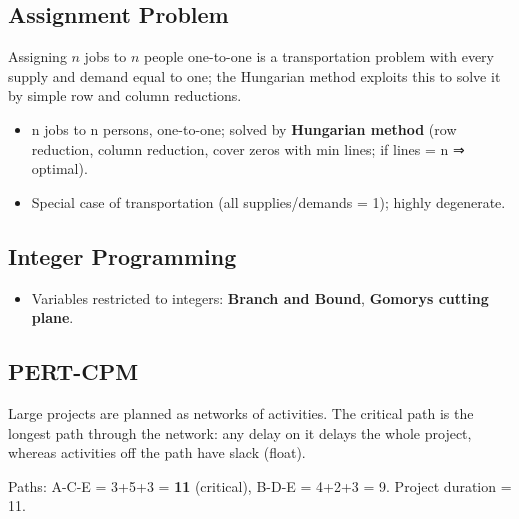 \needspace{125pt}

\hypertarget{p2-01--73-assignment-problem}{%
\subsection{Assignment Problem}\label{p2-01--73-assignment-problem}}

Assigning \(n\) jobs to \(n\) people one-to-one is a transportation problem with every supply and demand equal
to one; the Hungarian method exploits this to solve it by simple row and column reductions.

\begin{itemize}
\tightlist
\item
  n jobs to n persons, one-to-one; solved by \textbf{Hungarian method} (row reduction, column reduction, cover zeros with min lines; if lines = n ⇒ optimal).
\item
  Special case of transportation (all supplies/demands = 1); highly degenerate.
\end{itemize}

\needspace{95pt}

\hypertarget{p2-01--74-integer-programming}{%
\subsection{Integer Programming}\label{p2-01--74-integer-programming}}

\begin{itemize}
\tightlist
\item
  Variables restricted to integers: \textbf{Branch and Bound}, \textbf{Gomory\textquotesingle s cutting plane}.
\end{itemize}

\needspace{125pt}

\hypertarget{p2-01--75-pert-cpm}{%
\subsection{PERT-CPM}\label{p2-01--75-pert-cpm}}

Large projects are planned as networks of activities. The critical path is the longest path through the
network: any delay on it delays the whole project, whereas activities off the path have slack (float).



Paths: A-C-E = 3+5+3 = \textbf{11} (critical), B-D-E = 4+2+3 = 9. Project duration = 11.

\begingroup\small

